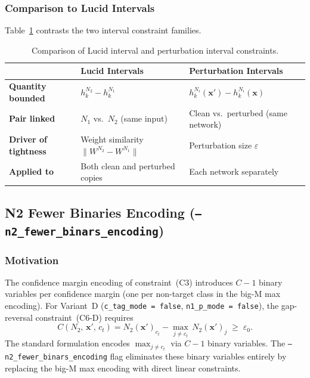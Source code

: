 \documentclass[11pt,a4paper]{article}
\theoremstyle{definition}
\theoremstyle{plain}
\newcommand{\Conf}[3]{C(#1,\,#2,\,#3)}
\newcommand{\NN}[1]{N_{#1}}
\newcommand{\vx}{\mathbf{x}}
\newcommand{\vxp}{\mathbf{x}'}
\newcommand{\eps}{\varepsilon}
\newcommand{\epszero}{\varepsilon_0}
\begin{document}
\subsubsection{Comparison to Lucid Intervals}

Table~\ref{tab:interval_compare} contrasts the two interval constraint families.

\begin{table}[h]
\centering
\caption{Comparison of Lucid interval and perturbation interval constraints.}
\label{tab:interval_compare}
\begin{tabular}{lll}
\toprule
 & \textbf{Lucid Intervals} & \textbf{Perturbation Intervals} \\
\midrule
\textbf{Quantity bounded} & $h_k^{\NN{2}} - h_k^{\NN{1}}$ & $h_k^{\NN{i}}(\vxp) - h_k^{\NN{i}}(\vx)$ \\
\textbf{Pair linked} & $\NN{1}$ vs.\ $\NN{2}$ (same input) & Clean vs.\ perturbed (same network) \\
\textbf{Driver of tightness} & Weight similarity $\|W^{\NN{2}}-W^{\NN{1}}\|$ & Perturbation size $\eps$ \\
\textbf{Applied to} & Both clean and perturbed copies & Each network separately \\
\bottomrule
\end{tabular}
\end{table}

\subsection{N2 Fewer Binaries Encoding (\texttt{--n2\_fewer\_binars\_encoding})}
\label{sec:n2fewer}

\subsubsection{Motivation}

The confidence margin encoding of constraint~(C3) introduces $C-1$ binary variables per confidence margin (one per non-target class in the big-M max encoding). For Variant~D (\texttt{c\_tag\_mode = false}, \texttt{n1\_p\_mode = false}), the gap-reversal constraint~(C6-D) requires
\[
  \Conf{\NN{2}}{\vxp}{c_t} = \NN{2}(\vxp)_{c_t} - \max_{j \ne c_t}\,\NN{2}(\vxp)_j \;\ge\; \epszero.
\]
The standard formulation encodes $\max_{j\ne c_t}$ via $C-1$ binary variables. The \texttt{--n2\_fewer\_binars\_encoding} flag eliminates these binary variables entirely by replacing the big-M max encoding with direct linear constraints.
\end{document}
